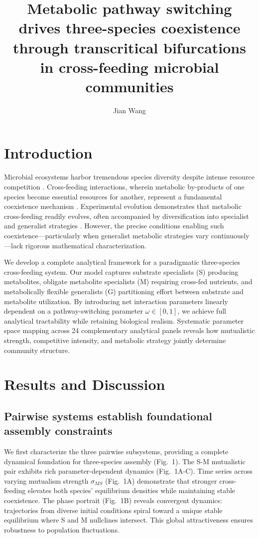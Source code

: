 \documentclass[9pt,twocolumn,twoside]{pnas-new}
\title{Metabolic pathway switching drives three-species coexistence through transcritical bifurcations in cross-feeding microbial communities}
\author[a]{Jian Wang}
\affil[a]{Department of Mathematics and Biological Sciences}
\begin{document}
\maketitle
\thispagestyle{firststyle}

\section*{Introduction}

Microbial ecosystems harbor tremendous species diversity despite intense resource competition \cite{hug2016new,louca2016decoupling}. Cross-feeding interactions, wherein metabolic by-products of one species become essential resources for another, represent a fundamental coexistence mechanism \cite{ponomarova2015metabolic,goldford2018emergent}. Experimental evolution demonstrates that metabolic cross-feeding readily evolves, often accompanied by diversification into specialist and generalist strategies \cite{rosenzweig2013microbial,mccully2017emergence,garcia2021eco}. However, the precise conditions enabling such coexistence—particularly when generalist metabolic strategies vary continuously—lack rigorous mathematical characterization.

We develop a complete analytical framework for a paradigmatic three-species cross-feeding system. Our model captures substrate specialists (S) producing metabolites, obligate metabolite specialists (M) requiring cross-fed nutrients, and metabolically flexible generalists (G) partitioning effort between substrate and metabolite utilization. By introducing net interaction parameters linearly dependent on a pathway-switching parameter $\omega \in [0,1]$, we achieve full analytical tractability while retaining biological realism. Systematic parameter space mapping across 24 complementary analytical panels reveals how mutualistic strength, competitive intensity, and metabolic strategy jointly determine community structure.

\section*{Results and Discussion}

\subsection*{Pairwise systems establish foundational assembly constraints}

We first characterize the three pairwise subsystems, providing a complete dynamical foundation for three-species assembly (Fig.~1). The S-M mutualistic pair exhibits rich parameter-dependent dynamics (Fig.~1A-C). Time series across varying mutualism strength $\sigma_{MS}$ (Fig.~1A) demonstrate that stronger cross-feeding elevates both species' equilibrium densities while maintaining stable coexistence. The phase portrait (Fig.~1B) reveals convergent dynamics: trajectories from diverse initial conditions spiral toward a unique stable equilibrium where S and M nullclines intersect. This global attractiveness ensures robustness to population fluctuations.
\end{document}
